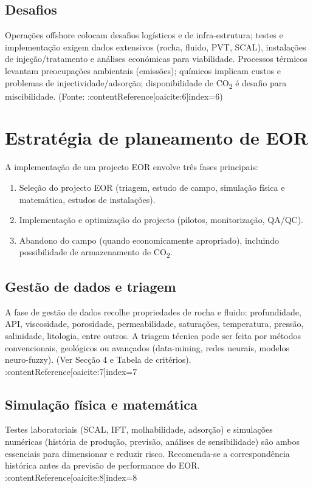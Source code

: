 \documentclass[11pt,a4paper]{article}
\begin{document}
\subsection{Desafios}
Operações offshore colocam desafios logísticos e de infra-estrutura; testes e implementação exigem dados extensivos (rocha, fluido, PVT, SCAL), instalações de injeção/tratamento e análises económicas para viabilidade. Processos térmicos levantam preocupações ambientais (emissões); químicos implicam custos e problemas de injectividade/adsorção; disponibilidade de CO\textsubscript{2} é desafio para miscibilidade. (Fonte: :contentReference[oaicite:6]{index=6})

\section{Estratégia de planeamento de EOR}
A implementação de um projecto EOR envolve três fases principais:
\begin{enumerate}
  \item Seleção do projecto EOR (triagem, estudo de campo, simulação física e matemática, estudos de instalações).
  \item Implementação e optimização do projecto (pilotos, monitorização, QA/QC).
  \item Abandono do campo (quando economicamente apropriado), incluindo possibilidade de armazenamento de CO\textsubscript{2}.
\end{enumerate}

\subsection{Gestão de dados e triagem}
A fase de gestão de dados recolhe propriedades de rocha e fluido: profundidade, API, viscosidade, porosidade, permeabilidade, saturações, temperatura, pressão, salinidade, litologia, entre outros. A triagem técnica pode ser feita por métodos convencionais, geológicos ou avançados (data-mining, redes neurais, modelos neuro-fuzzy). (Ver Secção 4 e Tabela de critérios). :contentReference[oaicite:7]{index=7}

\subsection{Simulação física e matemática}
Testes laboratoriais (SCAL, IFT, molhabilidade, adsorção) e simulações numéricas (história de produção, previsão, análises de sensibilidade) são ambos essenciais para dimensionar e reduzir risco. Recomenda-se a correspondência histórica antes da previsão de performance do EOR. :contentReference[oaicite:8]{index=8}
\end{document}
